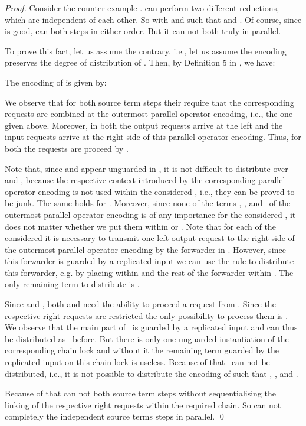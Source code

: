 \documentclass[]{llncs}
\begin{document}
\begin{proof}
	Consider the counter example .  can perform two different reductions, which are independent of each other. So  with  and  such that  and . Of course, since  is good,  can \simulate both steps in either order. But it can not \simulate both truly in parallel.
	
	To prove this fact, let us assume the contrary, i.e., let us assume the encoding  preserves the degree of distribution of . Then, by Definition 5 in \cite{petersNestmann12}, we have:
	
	The encoding of  is given by:
	
	We observe that for both source term steps their \simulations require that the corresponding requests are combined at the outermost parallel operator encoding, i.e., the one given above. Moreover, in both \simulations the output requests arrive at the left and the input requests arrive at the right side of this parallel operator encoding. Thus, for both \simulations the requests are proceed by \processRightInputRequests.
	
	Note that, since  and  appear unguarded in , it is not difficult to distribute  over  and , because the respective context introduced by the corresponding parallel operator encoding is not used within the considered \simulations, i.e., they can be proved to be junk. The same holds for . Moreover, since none of the terms \processLeftInputRequests, \processRightOutputRequests, and \pushRequests \ of the outermost parallel operator encoding is of any importance for the considered \simulations, it does not matter whether we put them within  or . Note that for each of the considered \simulations it is necessary to transmit one left output request to the right side of the outermost parallel operator encoding by the forwarder in \processLeftOutputRequests. However, since this forwarder is guarded by a replicated input we can use the rule  to distribute this forwarder, e.g. by placing  within  and the rest of the forwarder within . The only remaining term to distribute is \processRightInputRequests.
	
	Since  and , both  and  need the ability to proceed a request from . Since the respective right requests are restricted the only possibility to process them is \processRightInputRequests. We observe that the main part of \processRightInputRequests \ is guarded by a replicated input and can thus be distributed as \processLeftOutputRequests \ before. But there is only one unguarded instantiation of the corresponding chain lock  and without it the remaining term guarded by the replicated input on this chain lock is useless. Because of that \processRightInputRequests \ can not be distributed, i.e., it is not possible to distribute the encoding of  such that , , and .
	
	Because of that  can not \simulate both source term steps without sequentialising the linking of the respective right requests within the required chain. So  can not completely \simulate the independent source terms steps in parallel.
	\qed
\end{proof}
\end{document}
